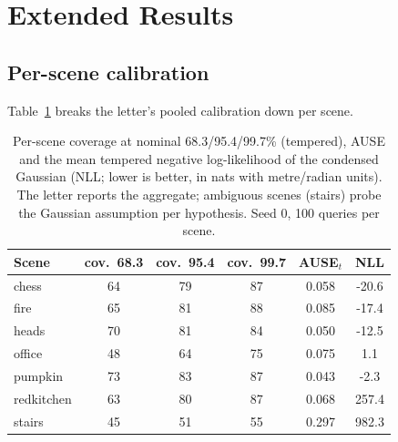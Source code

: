 \documentclass[journal]{IEEEtran}
\begin{document}
\section{Extended Results}
\label{sec:results}

\subsection{Per-scene calibration}
Table~\ref{tab:perscene-calib} breaks the letter's pooled calibration down per scene.
\begin{table}[h]
\caption{Per-scene coverage at nominal 68.3/95.4/99.7\% (tempered), AUSE and the mean tempered negative log-likelihood of the condensed Gaussian (NLL; lower is better, in nats with metre/radian units). The letter reports the aggregate; ambiguous scenes
(stairs) probe the Gaussian assumption per hypothesis.
Seed 0, 100 queries per scene.}
\label{tab:perscene-calib}
\centering\footnotesize
\setlength{\tabcolsep}{3.5pt}
\begin{tabular}{@{}lccccc@{}}
\toprule
Scene & cov.\ 68.3 & cov.\ 95.4 & cov.\ 99.7 & AUSE$_t$ & NLL \\
\midrule
chess      & 64 & 79 & 87 & 0.058 & -20.6 \\
fire       & 65 & 81 & 88 & 0.085 & -17.4 \\
heads      & 70 & 81 & 84 & 0.050 & -12.5 \\
office     & 48 & 64 & 75 & 0.075 & 1.1 \\
pumpkin    & 73 & 83 & 87 & 0.043 & -2.3 \\
redkitchen & 63 & 80 & 87 & 0.068 & 257.4 \\
stairs     & 45 & 51 & 55 & 0.297 & 982.3 \\
\bottomrule
\end{tabular}
\end{table}
\end{document}
